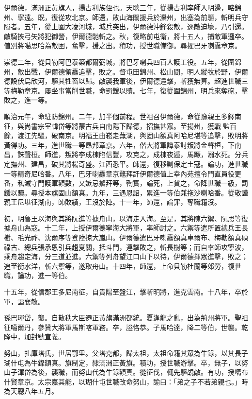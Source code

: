 \begin{pinyinscope}
伊爾德，滿洲正黃旗人，揚古利族侄也。天聰三年，從揚古利率師入明邊，略錦州、寧遠。既，復從攻北京。師還，敗山海關援兵於灤州，出塞為前驅，斬明兵守隘者。五年，從上圍大凌河城，城兵突出，伊爾德沖鋒殺敵，逐敵迫壕，乃引還。敵騎挾弓矢將犯御營，伊爾德馳斬之。秋，復略前屯衛，將十五人，捕敵軍邏卒。值別將噶思哈為敵困，奮擊，援之出。積功，授世職備御。尋擢巴牙喇纛章京。

崇德二年，從貝勒阿巴泰築都爾弼城，將巴牙喇兵四百人護工役。五年，從圍錦州，敵出戰，伊爾德領纛追擊，敗之。督屯田錦州、松山間，明人縱牧於野，伊爾德設伏烏欣河，驅其牲畜以歸。敵襲我軍後，伊爾德還擊，斬獲無算。超進世職三等梅勒章京。屢坐事當削世職，命罰鍰以贖。七年，復從圍錦州，明兵來奪砲，擊敗之，進一等。

順治元年，命駐防錦州。二年，加半個前程。世祖召伊爾德，命從豫親王多鐸南征，與尚書宗室韓岱等將蒙古兵自南陽下歸德，招撫甚眾。至揚州，獲戰監百餘，渡江先驅，破南京。明福王由崧走蕪湖，與固山額真阿哈尼堪等追擊，敗明將黃得功。三年，進世職一等昂邦章京。六年，偕大將軍譚泰討叛將金聲桓，下南昌，誅聲桓。師進，叛將李成棟陷信豐，攻克之，成棟夜遁，馬蹶，溺水死。分兵定撫州、建昌，破其將楊奇盛。江西悉平。師還，復移剿保定土寇。論功，進世職一等精奇尼哈番。八年，巴牙喇纛章京鼇拜訐伊爾德值上幸內苑擅令門直員役更番，私減守門護軍額數，又嫉忌鰲拜等，鞫實，論死，上貸之，命降世職一級，罰鍰以贖。尋授本旗固山額真。九年，三遇恩詔，累進一等伯兼拖沙喇哈番。從敬謹親王尼堪征湖南，師敗績，王沒於陣。十一年，師還，論罪，奪職籍沒。

初，明魯王以海與其將阮進等據舟山，以海走入海。至是，其將陳六禦、阮思等復據舟山為寇。十二年，上授伊爾德寧海大將軍，率師討之。六禦等遣所置總兵王長樹、毛光祚、沈爾序等登陸掠大嵐山。伊爾德遣巴牙喇纛額真車爾布、梅勒額真碩祿古、總兵張承恩引兵趨夏關，抵斗門，連擊敗之，斬長樹等；而自率師攻寧波，乘舟趨定海，分三道並進。六禦等列舟望江口山下以待，伊爾德揮眾進擊，敗之；追至衡水洋，斬六禦等，遂取舟山。十四年，師還，上命貝勒杜蘭等郊勞，復世職，論功，進一等伯。

十五年，從信郡王多尼南征，自貴陽至盤江，擊斬明將，進克雲南。十八年，卒於軍，謚襄敏。

孫巴琿岱，襲。自散秩大臣遷正黃旗滿洲都統。夏逢龍之亂，出為荊州將軍。聖祖征噶爾丹，參贊大將軍馬斯喀軍務。卒，謚恪恭。子馬哈達，降二等伯，世襲。乾隆中，加封號宣義。

努山，扎庫塔氏，世居鄂里。父塔克都，歸太祖，太祖命籍其眾為牛錄，以其長子瑚什屯為牛錄額真。旗制定，隸滿洲正黃旗。積功，授世職游擊。卒，無子，以努山子渾岱為後，襲職，而努山代為牛錄額真。從征伐，輒先驅覘敵。有功，授噶布什賢章京。太宗嘉其能，以瑚什屯世職改命努山，諭曰：「弟之子不若弟親也。」時為天聰八年五月。


\end{pinyinscope}
